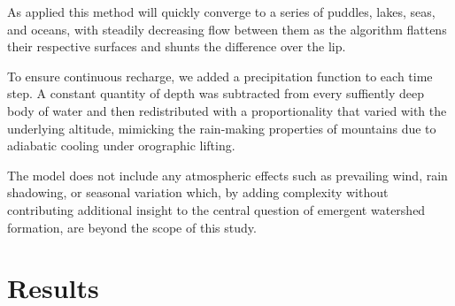 \documentclass[12pt]{iopart}
\numberwithin{equation}{section}
\begin{document}
As applied this method will quickly converge to a series of puddles, lakes, seas, and oceans, with steadily decreasing flow between them as the algorithm flattens their respective surfaces and shunts the difference over the lip. 

To ensure continuous recharge, we added a precipitation function to each time step. A constant quantity of depth was subtracted from every suffiently deep body of water and then redistributed with a proportionality that varied with the underlying altitude, mimicking the rain-making properties of mountains due to adiabatic cooling under orographic lifting\cite{rainmountains}. 

The model does not include any atmospheric effects such as prevailing wind, rain shadowing, or seasonal variation which, by adding complexity without contributing additional insight to the central question of emergent watershed formation, are beyond the scope of this study.

\section{Results}
\end{document}
